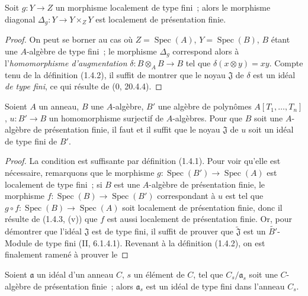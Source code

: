 \begin{corollary}[1.4.3.1]
\label{IV.1.4.3.1-fr}
Soit $g:Y\to Z$ un morphisme localement de type fini~; alors le morphisme
diagonal $\Delta_g:Y\to Y\times_ZY$ est localement de présentation finie.
\end{corollary}


\begin{proof}
On peut se borner au cas où $Z=\operatorname{Spec}(A)$, $Y=\operatorname{Spec}(B)$, $B$ étant une
$A$-algèbre de type fini~; le morphisme $\Delta_g$ correspond alors à
l'\emph{homomorphisme d'augmentation} $\delta:B\otimes_AB\to B$ tel que
$\delta(x\otimes y)=xy$. Compte tenu de la définition (1.4.2), il suffit de
montrer que le noyau $\mathfrak J$ de $\delta$ est un idéal \emph{de type
fini}, ce qui résulte de (0, 20.4.4).
\end{proof}

\begin{proposition}[1.4.4]
\label{IV.1.4.4-fr}
Soient $A$ un anneau, $B$ une $A$-algèbre, $B'$ une algèbre de polynômes
$A[T_1,\ldots,T_n]$, $u:B'\to B$ un homomorphisme surjectif de
$A$-algèbres. Pour que $B$ soit une $A$-algèbre de présentation finie, il faut
et il suffit que le noyau $\mathfrak J$ de $u$ soit un idéal de type fini de
$B'$.
\end{proposition}

\begin{proof}
La condition est suffisante par définition (1.4.1). Pour voir qu'elle est
nécessaire, remarquons que le morphisme $g:\operatorname{Spec}(B')\to\operatorname{Spec}(A)$ est
localement de type fini~; si $B$ est une $A$-algèbre de présentation finie,
le morphisme $f:\operatorname{Spec}(B)\to\operatorname{Spec}(B')$ correspondant à $u$ est tel que
$g\circ f:\operatorname{Spec}(B)\to\operatorname{Spec}(A)$ soit localement de présentation finie, donc il
résulte de (1.4.3, (v)) que $f$ est aussi localement de présentation finie.
Or, pour démontrer que l'idéal $\mathfrak J$ est de type fini, il suffit de
prouver que $\widetilde{\mathfrak J}$ est un $\widetilde{B'}$-Module de type
fini (II, 6.1.4.1). Revenant à la définition (1.4.2), on est finalement ramené
à prouver le
\end{proof}

\begin{lemma}[1.4.4.1]
\label{IV.1.4.4.1-fr}
Soient $\mathfrak a$ un idéal d'un anneau $C$, $s$ un élément de $C$, tel que
$C_s/\mathfrak a_s$ soit une $C$-algèbre de présentation finie~; alors
$\mathfrak a_s$ est un idéal de type fini dans l'anneau $C_s$.
\end{lemma}

